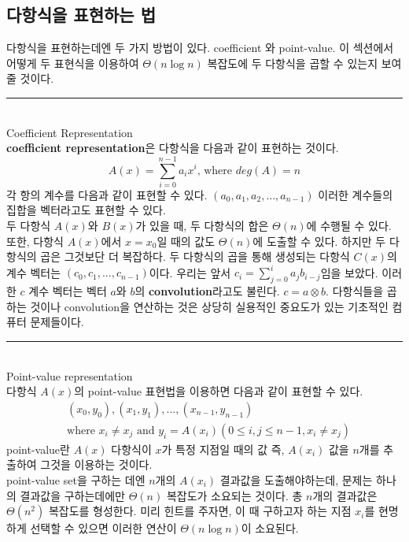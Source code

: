 \documentclass{article}
\begin{document}
\subsection{다항식을 표현하는 법}

다항식을 표현하는데엔 두 가지 방법이 있다. coefficient 와 point-value. 이 섹션에서 어떻게 두 표현식을 이용하여 $\Theta (n \log n)$ 복잡도에 두 다항식을 곱할 수 있는지 보여줄 것이다. 
\\
\noindent\rule{10cm}{1pt}
\\
\Large{Coefficient Representation}
\vspace{5mm}
\normalsize
\\
\textbf{coefficient representation}은 다항식을 다음과 같이 표현하는 것이다. 
$$
A(x) = \sum_{i=0}^{n-1}a_ix^i \text{, where } deg(A) = n
$$
각 항의 계수를 다음과 같이 표현할 수 있다. $(a_0, a_1, a_2, \dots ,a_{n-1})$ 이러한 계수들의 집합을 벡터라고도 표현할 수 있다. 
\\
두 다항식 $A(x)$와 $B(x)$가 있을 때, 두 다항식의 합은 $\Theta (n)$에 수행될 수 있다. 또한, 다항식 $A(x)$에서 $x=x_0$일 때의 값도 $\Theta (n)$에 도출할 수 있다. 하지만 두 다항식의 곱은 그것보단 더 복잡하다. 두 다항식의 곱을 통해 생성되는 다항식 $C(x)$의 계수 벡터는 $(c_0, c_1, ... ,c_{n-1})$이다. 우리는 앞서 $c_i = \sum_{j=0}^{i}a_jb_{i-j}$임을 보았다. 이러한 $c$ 계수 벡터는 벡터 $a$와 $b$의 \textbf{convolution}라고도 불린다. $c= a \otimes b$. 다항식들을 곱하는 것이나 convolution을 연산하는 것은 상당히 실용적인 중요도가 있는 기초적인 컴퓨터 문제들이다. 
\\
\noindent\rule{10cm}{1pt}
\\
\Large{Point-value representation}
\vspace{5mm}
\normalsize
\\
다항식 $A(x)$의 point-value 표현법을 이용하면 다음과 같이 표현할 수 있다. 
\begin{align*}
&{(x_0, y_0), (x_1, y_1), ... ,(x_{n-1}, y_{n-1})}\tag{3}\\ 
&\text{where } x_i \ne x_j \text{ and } y_i = A(x_i) (0 \le i, j \le n-1, x_i \ne x_j)
\end{align*}
point-value란 $A(x)$ 다항식이 $x$가 특정 지점일 때의 값 즉, $A(x_i)$ 값을 $n$개를 추출하여 그것을 이용하는 것이다.  
\\ 
point-value set을 구하는 데엔 $n$개의 $A(x_i)$ 결과값을 도출해야하는데, 문제는 하나의 결과값을 구하는데에만 $\Theta (n)$ 복잡도가 소요되는 것이다. 총 $n$개의 결과값은 $\Theta (n^2)$ 복잡도를 형성한다. 미리 힌트를 주자면, 이 때 구하고자 하는 지점 $x_i$를 현명하게 선택할 수 있으면 이러한 연산이 $\Theta (n \log n)$이 소요된다.  
\end{document}
